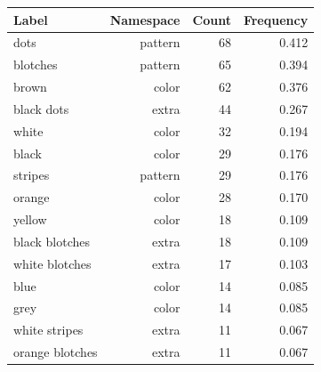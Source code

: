\begin{tabular}{lrrr}
\toprule
Label & Namespace & Count & Frequency \\
\midrule
dots & pattern & 68 & 0.412 \\
blotches & pattern & 65 & 0.394 \\
brown & color & 62 & 0.376 \\
black dots & extra & 44 & 0.267 \\
white & color & 32 & 0.194 \\
black & color & 29 & 0.176 \\
stripes & pattern & 29 & 0.176 \\
orange & color & 28 & 0.170 \\
yellow & color & 18 & 0.109 \\
black blotches & extra & 18 & 0.109 \\
white blotches & extra & 17 & 0.103 \\
blue & color & 14 & 0.085 \\
grey & color & 14 & 0.085 \\
white stripes & extra & 11 & 0.067 \\
orange blotches & extra & 11 & 0.067 \\
\bottomrule
\end{tabular}
